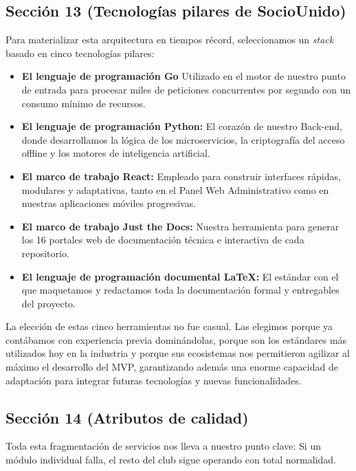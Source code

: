 \subsection{Sección 13 (Tecnologías pilares de SocioUnido)}

Para materializar esta arquitectura en tiempos récord, seleccionamos un \textit{stack} basado en cinco tecnologías pilares:

\begin{itemize}
    \item \textbf{El lenguaje de programación Go} Utilizado en el motor de nuestro punto de entrada para procesar miles de peticiones concurrentes por segundo con un consumo mínimo de recursos.
    \item \textbf{El lenguaje de programación Python:} El corazón de nuestro Back-end, donde desarrollamos la lógica de los microservicios, la criptografía del acceso offline y los motores de inteligencia artificial.
    \item \textbf{El marco de trabajo React:} Empleado para construir interfaces rápidas, modulares y adaptativas, tanto en el Panel Web Administrativo como en nuestras aplicaciones móviles progresivas.
    \item \textbf{El marco de trabajo Just the Docs:} Nuestra herramienta para generar los 16 portales web de documentación técnica e interactiva de cada repositorio.
    \item \textbf{El lenguaje de programación documental LaTeX:} El estándar con el que maquetamos y redactamos toda la documentación formal y entregables del proyecto.
\end{itemize}

La elección de estas cinco herramientas no fue casual. Las elegimos porque ya contábamos con experiencia previa dominándolas, porque son los estándares más utilizados hoy en la industria y porque sus ecosistemas nos permitieron agilizar al máximo el desarrollo del MVP, garantizando además una enorme capacidad de adaptación para integrar futuras tecnologías y nuevas funcionalidades.

\newpage

\subsection{Sección 14 (Atributos de calidad)}

Toda esta fragmentación de servicios nos lleva a nuestro punto clave: Si un módulo individual falla, el resto del club sigue operando con total normalidad. 

